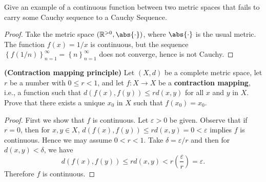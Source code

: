 \documentclass[12pt]{amsart}
\begin{document}
\begin{setup}
  Give an example of a continuous function between two metric spaces that fails to carry some Cauchy sequence to a Cauchy Sequence.
  \begin{proof}
    Take the metric space $(\mathbb{R}^{>0}, \abs{\cdot})$, where $\abs{\cdot}$ is the usual metric.
    The function $f(x) = 1/x$ is continuous, but the sequence $\left\{f(1/n)\right\}_{n=1}^\infty = \left\{n\right\}_{n=1}^\infty$ does not converge, hence is not Cauchy.
  \end{proof}
\end{setup}

\begin{setup}
  {\bf (Contraction mapping principle)} Let $(X,d)$ be a complete metric space, let $r$ be a number with $0 \leq r < 1$, and let $f \colon X \rightarrow X$ be a {\bf contraction mapping}, i.e., a function such that $d(f(x), f(y)) \leq rd(x,y)$ for all $x$ and $y$ in $X$.
  Prove that there exists a unique $x_0$ in $X$ such that $f(x_0) = x_0$.
  
  \begin{proof}
    First we show that $f$ is continuous.
    Let $\varepsilon > 0$ be given.
    Observe that if $r = 0$, then for $x,y \in X$, $d(f(x),f(y)) \leq rd(x,y) = 0 < \varepsilon$ implies $f$ is continuous.
    Hence we may assume $0 < r < 1$.
    Take $\delta = \varepsilon/r$ and then for $d(x,y) < \delta$, we have $$d(f(x), f(y)) \leq rd(x,y) < r\left(\frac{\varepsilon}{r}\right) = \varepsilon.$$
    Therefore $f$ is continuous.
    

\end{proof}
\end{setup}
\end{document}
